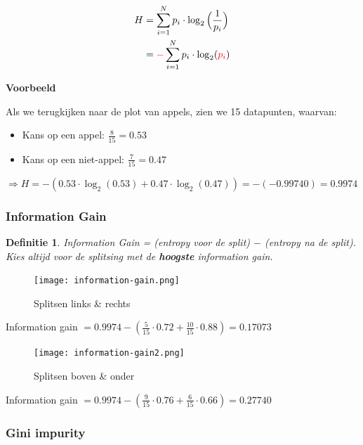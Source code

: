 \documentclass{article}
\newtheorem{theorem}{Definitie}[section]
\begin{document}
\begin{equation}
    \begin{aligned}
        H &= \sum_{i=1}^N p_i \cdot \log_2 \Big(\frac{1}{p_i}\Big)\\
        &= \textcolor{red}{-} \sum_{i=1}^N p_i \cdot \log_2 (\textcolor{red}{p_i})
    \end{aligned}
\end{equation}

\textbf{Voorbeeld}

Als we terugkijken naar de plot van appels, zien we 15 datapunten, waarvan:

\begin{itemize}
    \item Kans op een appel: $\frac{8}{15} = 0.53$
    \item Kans op een niet-appel: $\frac{7}{15} = 0.47$
\end{itemize}

$\Rightarrow H = - (0.53 \cdot \log_2 (0.53) + 0.47 \cdot \log_2(0.47)) = - (- 0.99740) = 0.9974$

\subsubsection{Information Gain}

\begin{theorem}
    Information Gain = (entropy voor de split) $-$ (entropy na de split). Kies altijd voor de splitsing met de \textbf{hoogste} information gain.
\end{theorem}

\begin{figure}[H]
    \centering
    \texttt{[image: information-gain.png]}
    \caption{Splitsen links \& rechts}
\end{figure}

Information gain $= 0.9974 - (\frac{5}{15} \cdot 0.72 + \frac{10}{15} \cdot 0.88) = 0.17073$


\begin{figure}[H]
    \centering
    \texttt{[image: information-gain2.png]}
    \caption{Splitsen boven \& onder}
\end{figure}

Information gain $= 0.9974 - (\frac{9}{15} \cdot 0.76 + \frac{6}{15} \cdot 0.66) = 0.27740$

\subsubsection{Gini impurity}
\end{document}
